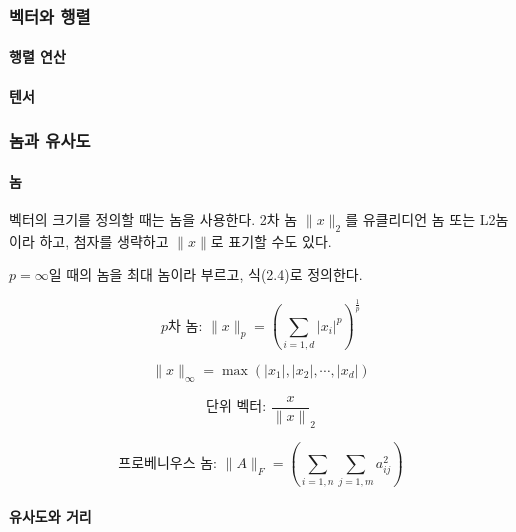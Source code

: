 \documentclass [12pt] {oblivoir}
\let\oldsubsubsection=\subsubsection
\renewcommand{\subsubsection}
{
  \filbreak
  \oldsubsubsection
}
\begin{document}
\subsubsection{벡터와 행렬}

\paragraph*{행렬 연산}\mbox{}

\paragraph*{텐서}\mbox{}

\subsubsection{놈과 유사도}

\paragraph*{놈}\mbox{}

벡터의 크기를 정의할 때는 놈을 사용한다. 2차 놈 $\lVert x \rVert_{2}$를 유클리디언 놈 또는 L2놈이라 하고, 첨자를 생략하고 $\lVert x \rVert$로 표기할 수도 있다.

$p = \infty$일 때의 놈을 최대 놈이라 부르고, 식(2.4)로 정의한다.

\begin{equation} \tag{2.3}
  p\text{차 놈: } \lVert x \rVert_{p} = \left(\displaystyle\sum_{i=1,d}{\lvert x_{i} \rvert}^{p}\right)^{\frac{1}{p}}
\end{equation}

\begin{equation} \tag{2.4}
  \lVert x \rVert_{\infty} = \max(\lvert x_{1} \rvert, \lvert x_{2} \rvert, \cdots, \lvert x_{d} \rvert)
\end{equation}

\begin{equation} \tag{2.5}
  \text{단위 벡터: } \frac{x}{\lVert x \rVert}_{2}
\end{equation}

\begin{equation} \tag{2.6}
  \text{프로베니우스 놈: } \lVert A \rVert_{F} = \left(\displaystyle\sum_{i=1,n}\sum_{j=1,m}a_{ij}^{2}\right)
\end{equation}

\paragraph*{유사도와 거리}\mbox{}
\end{document}
